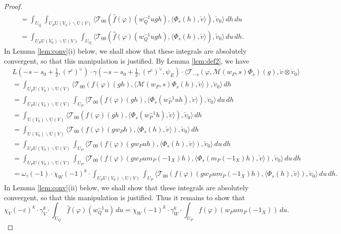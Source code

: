 \documentclass[11pt]{amsart}
\numberwithin{equation}{section}
\theoremstyle{plain}
\theoremstyle{definition}
\theoremstyle{remark}
\def\U{\mathrm{U}}
\def\M{\mathcal{M}}
\def\T{\mathcal{T}}
\begin{document}
\begin{proof}
\begin{align*}
 & = \int_{U_Q} \int_{U_P \U(V_0) \backslash \U(V)}
 \langle \T_{00} (\hat{f}(\varphi)(w_Q^{-1} u g h), 
 \langle \Phi_s(h), \check{v} \rangle ), \check{v}_0 \rangle \, dh \, du \\
 & = \int_{U_P \U(V_0) \backslash \U(V)} \int_{U_Q}
 \langle \T_{00} (\hat{f}(\varphi)(w_Q^{-1} u g h), 
 \langle \Phi_s(h), \check{v} \rangle ), \check{v}_0 \rangle \, du \, dh.
\end{align*}
In Lemma \ref{lem:conv}(i) below, we shall show that these integrals are absolutely convergent,
so that this manipulation is justified.
By Lemma \ref{lem:def2}, we have
\begin{align*}
 & L(-s-s_0+\tfrac{1}{2}, (\tau^c)^\vee) \cdot \gamma(-s-s_0+\tfrac{1}{2}, (\tau^c)^\vee, \psi_E) \cdot 
 \langle \T_{-s}(\varphi, \M(w_P, s) \Phi_s)(g), \check{v} \otimes \check{v}_0 \rangle \\
 & = \int_{U_P \U(V_0) \backslash \U(V)}
 \langle \T_{00} (f(\varphi)(gh), \langle \M(w_P, s) \Phi_s(h), \check{v} \rangle ), \check{v}_0 \rangle \, dh \\
 & = \int_{U_P \U(V_0) \backslash \U(V)} \int_{U_P}
 \langle \T_{00} (f(\varphi)(gh), \langle \Phi_s(w_P^{-1} u h), \check{v} \rangle ), \check{v}_0 \rangle \, du \, dh \\
 & = \int_{\U(V_0) \backslash \U(V)}
 \langle \T_{00} (f(\varphi)(gh), \langle \Phi_s(w_P^{-1} h), \check{v} \rangle ), \check{v}_0 \rangle \, dh \\
 & = \int_{\U(V_0) \backslash \U(V)}
 \langle \T_{00} (f(\varphi)(g w_P h), \langle \Phi_s(h), \check{v} \rangle ), \check{v}_0 \rangle \, dh \\
 & = \int_{U_P \U(V_0) \backslash \U(V)} \int_{U_P}
 \langle \T_{00} (f(\varphi)(g w_P u h), \langle \Phi_s(h), \check{v} \rangle ), \check{v}_0 \rangle \, du \, dh \\
 & = \int_{U_P \U(V_0) \backslash \U(V)} \int_{U_P}
 \langle \T_{00} (f(\varphi)(g w_P u m_P(-1_X) h), \langle \Phi_s(m_P(-1_X) h), \check{v} \rangle ), \check{v}_0 \rangle \, du \, dh \\
 & = \omega_{\tau}(-1) \cdot \chi_W(-1)^k \cdot \int_{U_P \U(V_0) \backslash \U(V)} \int_{U_P}
 \langle \T_{00} (f(\varphi)(g w_P u m_P(-1_X) h), \langle \Phi_s(h), \check{v} \rangle ), \check{v}_0 \rangle \, du \, dh.
\end{align*}
In Lemma \ref{lem:conv}(ii) below, we shall show that these integrals are absolutely convergent,
so that this manipulation is justified.
Thus it remains to show that
\begin{equation}
\label{E:key}
 \chi_V(-\varepsilon)^k \cdot \gamma_{V}^k \cdot \int_{U_Q} \hat{f}(\varphi)(w_Q^{-1} u)\, du
 = \chi_W(-1)^k \cdot \gamma_{W}^k \cdot \int_{U_P} f(\varphi)(w_P u m_P(-1_X)) \, du.
\end{equation}


\end{proof}
\end{document}
